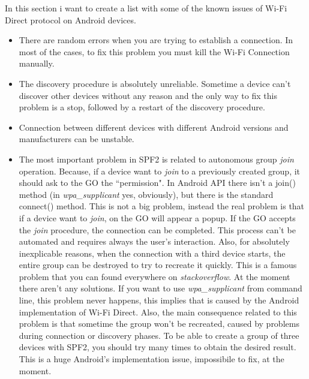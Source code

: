 In this section i want to create a list with some of the known issues of Wi-Fi Direct protocol on Android devices.
\begin{itemize}
	\item There are random errors when you are trying to establish a connection. In most of the cases, to fix this problem you must kill the Wi-Fi Connection manually.
	\item The discovery procedure is absolutely unreliable. Sometime a device can't discover other devices without any reason and the only way to fix this problem is a stop, followed by a restart of the discovery procedure.
	\item Connection between different devices with different Android versions and manufacturers can be unstable.
	\item The most important problem in SPF2 is related to autonomous group \emph{join} operation. Because, if a device want to \emph{join} to a previously created group, it should ask to the GO the ``permission". In Android API there isn't a \textsf{join()} method (in \emph{wpa\_supplicant} yes, obviously), but there is the standard \textsf{connect()} method. This is not a big problem, instead the real problem is that if a device want to \emph{join}, on the GO will appear a popup. If the GO accepts the \emph{join} procedure, the connection can be completed. This process can't be automated and requires always the user's interaction. Also, for absolutely inexplicable reasons, when the connection with a third device starts, the entire group can be destroyed to try to recreate it quickly. This is a famous problem that you can found everywhere on \emph{stackoverflow}. At the moment there aren't any solutions. If you want to use \emph{wpa\_supplicant} from command line, this problem never happens, this implies that is caused by the Android implementation of Wi-Fi Direct. Also, the main consequence related to this problem is that sometime the group won't be recreated, caused by problems during connection or discovery phases. To be able to create a group of three devices with SPF2, you should try many times to obtain the desired result. This is a huge Android's implementation issue, impossibile to fix, at the moment.
\end{itemize}


